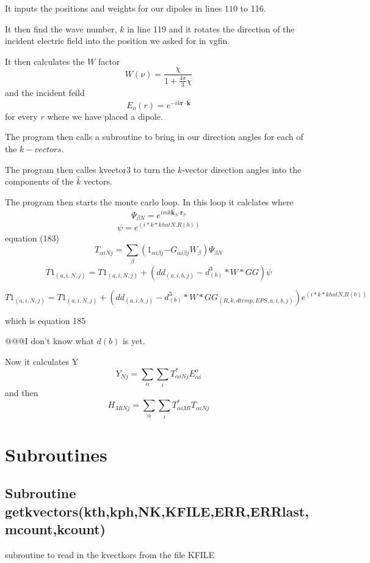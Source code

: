 \documentclass{article}
\begin{document}
It inputs the positions and weights for our dipoles in lines $110$ to 116.

It then find the wave number, $k$ in line 119 and it rotates the direction
of the incident electric field into the position we asked for in vgfin.

It then calculates the $W$ factor 
\[
W\left( \nu \right) =\frac{\chi }{1+\frac{4\pi }{3}\chi } 
\]%
and the incident feild 
\[
E_{o}\left( r\right) =e^{-ik\mathbf{r}\cdot \mathbf{\hat{k}}} 
\]%
for every $r$ where we have placed a dipole.

The program then calls a subroutine to bring in our direction angles for
each of the $k-vectors.$

The program then calles kvector3 to turn the $k$-vector direction angles
into the components of the $\hat{k}$ vectors.

The program then starts the monte carlo loop. In this loop it calclates
where 
\begin{equation}
\Psi _{\beta N}=e^{imk\mathbf{\hat{k}}_{N}\mathbf{\cdot r}_{\beta }}
\label{PSYFUN}
\end{equation}%
\[
\psi =e^{(i\ast k\ast khatN.R(b))} 
\]%
equation (183)%
\[
T_{\alpha iNj}=\sum_{\beta }\left( 1_{\alpha i\beta j}\mathbf{-}G_{\alpha
i\beta j}W_{\beta }\right) \Psi _{\beta N} 
\]%
\[
T1_{(a,i,N,j)}=T1_{(a,i,N,j)}+(dd_{(a,i,b,j)}-d_{(b)}^{3}\ast W\ast GG)\psi 
\]

\[
T1_{(a,i,N,j)}=T1_{(a,i,N,j)}+(dd_{(a,i,b,j)}-d_{(b)}^{3}\ast W\ast
GG_{(R,k,dtemp,EPS,a,i,b,j)})e^{(i\ast k\ast khatN.R(b))} 
\]

which is equation 185

@@@I don't know what $d\left( b\right) $ is yet.

Now it calculates Y%
\[
Y_{Nj}=\sum_{\alpha }\sum_{i}T_{\alpha iNj}^{\ast }E_{\alpha i}^{o} 
\]%
and then 
\[
H_{MlNj}=\sum_{\alpha }\sum_{i}T_{\alpha iMl}^{\ast }T_{\alpha iNj} 
\]

\section{Subroutines}

\subsection{Subroutine
getkvectors(kth,kph,NK,KFILE,ERR,ERRlast,mcount,kcount)}

subroutine to read in the kvectkors from the file KFILE
\end{document}
